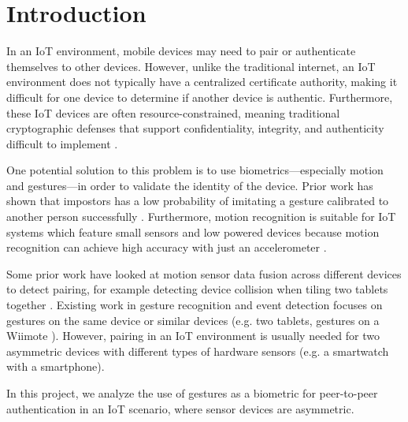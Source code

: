 
\section{Introduction}
\label{sec:Introduction}

In an \gls{IoT} environment, mobile devices may need to pair or authenticate themselves to other devices. However, unlike the traditional internet, an \gls{IoT} environment does not typically have a centralized certificate authority, making it difficult for one device to determine if another device is authentic. Furthermore, these \gls{IoT} devices are often resource-constrained, meaning traditional cryptographic defenses that support confidentiality, integrity, and authenticity difficult to implement \cite{cisco:iot-pf,authmodels}.

One potential solution to this problem is to use biometrics---especially motion and gestures---in order to validate the identity of the device. Prior work has shown that impostors has a low probability of imitating a gesture calibrated to another person successfully \cite{Casanova}. Furthermore, motion recognition is suitable for \gls{IoT} systems which feature small sensors and low powered devices because motion recognition can achieve high accuracy with just an accelerometer \cite{RuizeXu}. 

Some prior work have looked at motion sensor data fusion across different devices to detect pairing, for example detecting device collision when tiling two tablets together \cite{SyncGes}. Existing work in gesture recognition and event detection focuses on gestures on the same device or similar devices (e.g. two tablets, gestures on a Wiimote \cite{LiuuWave}). However, pairing in an \gls{IoT} environment is usually needed for two asymmetric devices with different types of hardware sensors (e.g. a smartwatch with a smartphone).

In this project, we analyze the use of gestures as a biometric for peer-to-peer authentication in an \gls{IoT} scenario, where sensor devices are asymmetric. 

